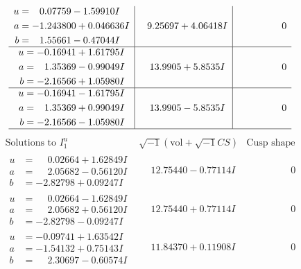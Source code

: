 \documentclass[1p]{elsarticle_modified}
\theoremstyle{definition}
\newcommand{\I}{\sqrt{-1}}
\begin{document}
$$\begin{array}{c|c|c}
\begin{aligned}
u &= \phantom{-}0.07759 - 1.59910 I \\
a &= -1.243800 + 0.046636 I \\
b &= \phantom{-}1.55661 - 0.47044 I\end{aligned}
 & \phantom{-}9.25697 + 4.06418 I & \phantom{-0.000000 } 0 \\ \hline\begin{aligned}
u &= -0.16941 + 1.61795 I \\
a &= \phantom{-}1.35369 - 0.99049 I \\
b &= -2.16566 + 1.05980 I\end{aligned}
 & \phantom{-}13.9905 + 5.8535 I & \phantom{-0.000000 } 0 \\ \hline\begin{aligned}
u &= -0.16941 - 1.61795 I \\
a &= \phantom{-}1.35369 + 0.99049 I \\
b &= -2.16566 - 1.05980 I\end{aligned}
 & \phantom{-}13.9905 - 5.8535 I & \phantom{-0.000000 } 0\\
 \hline 
 \end{array}$$\newpage$$\begin{array}{c|c|c}  
\text{Solutions to }I^u_{1}& \I (\text{vol} + \sqrt{-1}CS) & \text{Cusp shape}\\
 \hline 
\begin{aligned}
u &= \phantom{-}0.02664 + 1.62849 I \\
a &= \phantom{-}2.05682 - 0.56120 I \\
b &= -2.82798 + 0.09247 I\end{aligned}
 & \phantom{-}12.75440 - 0.77114 I & \phantom{-0.000000 } 0 \\ \hline\begin{aligned}
u &= \phantom{-}0.02664 - 1.62849 I \\
a &= \phantom{-}2.05682 + 0.56120 I \\
b &= -2.82798 - 0.09247 I\end{aligned}
 & \phantom{-}12.75440 + 0.77114 I & \phantom{-0.000000 } 0 \\ \hline\begin{aligned}
u &= -0.09741 + 1.63542 I \\
a &= -1.54132 + 0.75143 I \\
b &= \phantom{-}2.30697 - 0.60574 I\end{aligned}
 & \phantom{-}11.84370 + 0.11908 I & \phantom{-0.000000 } 0 \\ \hline\begin{aligned}

\end{aligned}
\end{array}$$
\end{document}
